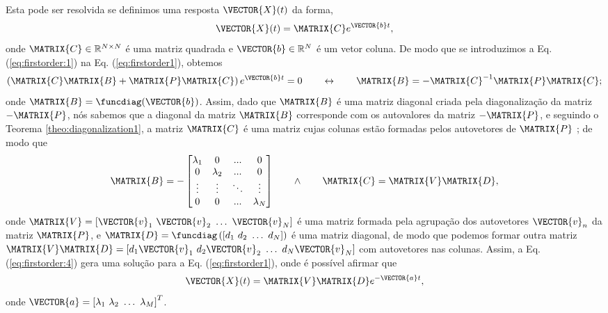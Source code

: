 \begin{myproofT}
Esta pode ser resolvida se definimos uma resposta $\VECTOR{X}(t)$ da forma, 
\begin{equation}\label{eq:firstorder:1}
\VECTOR{X}(t)=\MATRIX{C}e^{\VECTOR{b}t},
\end{equation}
onde $\MATRIX{C} \in \mathbb{R}^{N\times N}$ é uma matriz quadrada e $\VECTOR{b} \in \mathbb{R}^{N}$ é um vetor coluna.
De modo que se introduzimos a Eq. (\ref{eq:firstorder:1}) na Eq. (\ref{eq:firstorder1}),
obtemos 
\begin{equation}\label{eq:firstorder:2}
\left(\MATRIX{C}\MATRIX{B}+\MATRIX{P}\MATRIX{C}\right)e^{\VECTOR{b}t} = 0 
\qquad \leftrightarrow \qquad
\MATRIX{B}=-\MATRIX{C}^{-1}\MATRIX{P}\MATRIX{C};
\end{equation}
onde $\MATRIX{B}=\funcdiag(\VECTOR{b})$. 
Assim, dado que $\MATRIX{B}$ é uma matriz diagonal criada pela diagonalização da  
matriz $-\MATRIX{P}$, nós sabemos que
a diagonal da matriz $\MATRIX{B}$ corresponde com os autovalores da matriz $-\MATRIX{P}$,
e seguindo o Teorema \ref{theo:diagonalization1}, a matriz $\MATRIX{C}$ é uma matriz cujas colunas estão formadas pelos 
autovetores de $\MATRIX{P}$ \cite[pp. 67]{golub2013matrix}; de modo que
\begin{equation}\label{eq:firstorder:4}
\MATRIX{B}=-
\begin{bmatrix}
\lambda_1 & 0         & ...    & 0 \\
0         & \lambda_2 & ...    & 0 \\
\vdots    & \vdots    & \ddots & \vdots \\
0         & 0         & ...    & \lambda_N
\end{bmatrix}
\qquad \wedge \qquad 
\MATRIX{C}=\MATRIX{V}\MATRIX{D}, 
\end{equation}
onde $\MATRIX{V}=\left[ \VECTOR{v}_1~  \VECTOR{v}_2~  \dots~ \VECTOR{v}_N\right]$ 
é uma matriz formada pela agrupação dos autovetores $\VECTOR{v}_n$ da matriz $\MATRIX{P}$,
e $\MATRIX{D}=\funcdiag\left(\left[ d_1~  d_2~  \dots~ d_N\right]\right)$ 
é uma matriz diagonal, de modo que podemos formar outra matriz  
$\MATRIX{V}\MATRIX{D}=\left[ d_1\VECTOR{v}_1~  d_2\VECTOR{v}_2~  \dots~ d_N\VECTOR{v}_N\right]$
com autovetores nas colunas.
Assim, a Eq. (\ref{eq:firstorder:4}) gera uma solução para a Eq. (\ref{eq:firstorder1}),
onde é possível afirmar que
\begin{equation}\label{eq:firstorder:5}
\VECTOR{X}(t)=\MATRIX{V}\MATRIX{D} e^{-\VECTOR{a} t},
\end{equation}
onde $\VECTOR{a}=\left[ \lambda_1~ \lambda_2~ \dots~ \lambda_M\right]^{T}$.
\end{myproofT}

